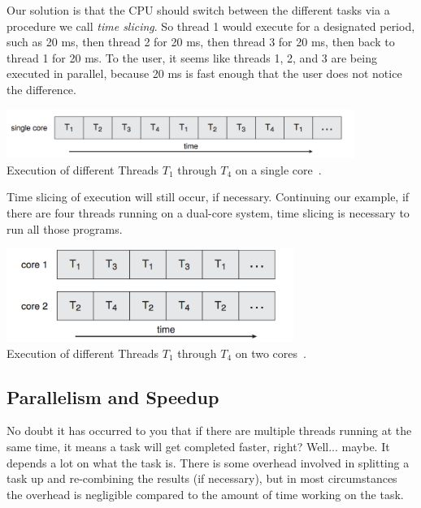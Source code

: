 \documentclass[a4paper]{report}
\begin{document}
Our solution is that the CPU should switch between the different tasks via a procedure we call \textit{time slicing}. So thread 1 would execute for a designated period, such as 20 ms, then thread 2 for 20 ms, then thread 3 for 20 ms, then back to thread 1 for 20 ms. To the user, it seems like threads 1, 2, and 3 are being executed in parallel, because 20 ms is fast enough that the user does not notice the difference.

\begin{center}
	\includegraphics[width=0.85\textwidth]{images/single-core-execution.png}\\
	Execution of different Threads $T_{1}$ through $T_{4}$ on a single core~\cite{osc}.
\end{center}

Time slicing of execution will still occur, if necessary. Continuing our example, if there are four threads running on a dual-core system, time slicing is necessary to run all those programs.

\begin{center}
	\includegraphics[width=0.7\textwidth]{images/dual-core-execution.png}\\
	Execution of different Threads $T_{1}$ through $T_{4}$ on two cores~\cite{osc}.
\end{center}

\subsection*{Parallelism and Speedup}

No doubt it has occurred to you that if there are multiple threads running at the same time, it means a task will get completed faster, right? Well... maybe. It depends a lot on what the task is. There is some overhead involved in splitting a task up and re-combining the results (if necessary), but in most circumstances the overhead is negligible compared to the amount of time working on the task.
\end{document}
